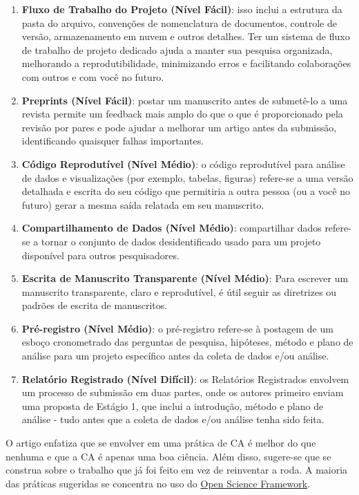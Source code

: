\documentclass[
  a4paper,
]{book}
\begin{document}
\begin{tcolorbox}
\begin{enumerate}
\def\labelenumi{\arabic{enumi}.}
\item
  \textbf{Fluxo de Trabalho do Projeto (Nível Fácil)}: isso inclui a
  estrutura da pasta do arquivo, convenções de nomenclatura de
  documentos, controle de versão, armazenamento em nuvem e outros
  detalhes. Ter um sistema de fluxo de trabalho de projeto dedicado
  ajuda a manter sua pesquisa organizada, melhorando a
  reprodutibilidade, minimizando erros e facilitando colaborações com
  outros e com você no futuro.
\item
  \textbf{Preprints (Nível Fácil)}: postar um manuscrito antes de
  submetê-lo a uma revista permite um feedback mais amplo do que o que é
  proporcionado pela revisão por pares e pode ajudar a melhorar um
  artigo antes da submissão, identificando quaisquer falhas importantes.
\item
  \textbf{Código Reprodutível (Nível Médio)}: o código reprodutível para
  análise de dados e visualizações (por exemplo, tabelas, figuras)
  refere-se a uma versão detalhada e escrita do seu código que
  permitiria a outra pessoa (ou a você no futuro) gerar a mesma saída
  relatada em seu manuscrito.
\item
  \textbf{Compartilhamento de Dados (Nível Médio)}: compartilhar dados
  refere-se a tornar o conjunto de dados desidentificado usado para um
  projeto disponível para outros pesquisadores.
\item
  \textbf{Escrita de Manuscrito Transparente (Nível Médio)}: Para
  escrever um manuscrito transparente, claro e reprodutível, é útil
  seguir as diretrizes ou padrões de escrita de manuscritos.
\item
  \textbf{Pré-registro (Nível Médio)}: o pré-registro refere-se à
  postagem de um esboço cronometrado das perguntas de pesquisa,
  hipóteses, método e plano de análise para um projeto específico antes
  da coleta de dados e/ou análise.
\item
  \textbf{Relatório Registrado (Nível Difícil)}: os Relatórios
  Registrados envolvem um processo de submissão em duas partes, onde os
  autores primeiro enviam uma proposta de Estágio 1, que inclui a
  introdução, método e plano de análise - tudo antes que a coleta de
  dados e/ou análise tenha sido feita.\vspace{0.5em}
\end{enumerate}

O artigo enfatiza que se envolver em uma prática de CA é melhor do que
nenhuma e que a CA é apenas uma boa ciência. Além disso, sugere-se que
se construa sobre o trabalho que já foi feito em vez de reinventar a
roda. A maioria das práticas sugeridas se concentra no uso do
\href{https://osf.io}{Open Science Framework}.

\end{tcolorbox}
\end{document}
